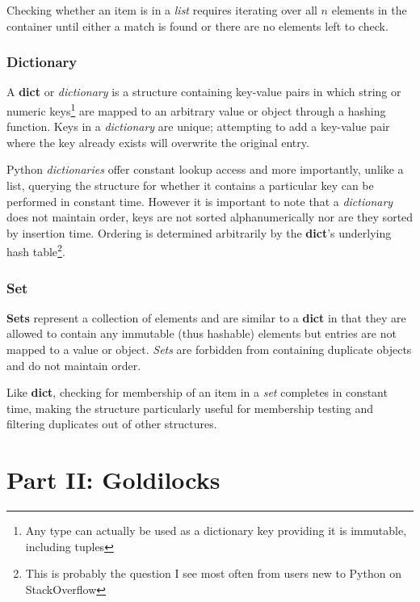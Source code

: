 Checking whether an item is in a \textit{list} requires iterating over all $n$
elements in the container until either a match is found or there are no elements
left to check\citep{py:timecomplexity}.


\subsubsection{Dictionary}

A \textbf{dict}\citep{py-dict} or \textit{dictionary} is a structure containing
key-value pairs in which string or numeric keys\footnote{Any type can actually
be used as a dictionary key providing it is immutable, including
tuples\citep{py-dict}} are mapped to an arbitrary value or object through a
hashing function. Keys in a \textit{dictionary} are unique; attempting to add a
key-value pair where the key already exists will overwrite the original entry.

Python \textit{dictionaries} offer constant lookup access and more importantly,
unlike a list, querying the structure for whether it contains a particular key
can be performed in constant time\citep{py:timecomplexity}.
However it is important to note that a \textit{dictionary} does not maintain
order, keys are not sorted alphanumerically nor are they sorted by insertion
time. Ordering is determined arbitrarily by the \textbf{dict}'s underlying hash
table\footnote{This is probably the question I see most often from users new to
Python on StackOverflow}.


\subsubsection{Set}

\textbf{Sets}\citep{py-set} represent a collection of elements and are similar
to a \textbf{dict} in that they are allowed to contain any immutable (thus
hashable) elements but entries are not mapped to a value or object.
\textit{Sets} are forbidden from containing duplicate objects and do not
maintain order.

Like \textbf{dict}, checking for membership of an item in a \textit{set}
completes in constant time, making the structure particularly useful for
membership testing and filtering duplicates out of other structures.



\section{Part II: Goldilocks}
\label{app:concepts-p2-1}
